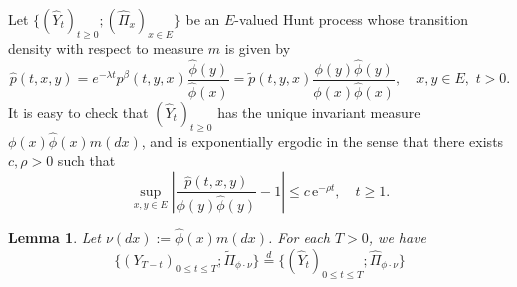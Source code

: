 \documentclass[12pt,a4paper]{amsart}
\numberwithin{equation}{section}
\theoremstyle{plain}
\newtheorem{lem}[thm]{Lemma}
\theoremstyle{definition}
\theoremstyle{remark}
\begin{document}
	Let $\{(\widehat{Y}_t)_{t\geq 0}; (\widehat{\Pi}_x)_{x\in E}\}$ be an $E$-valued Hunt process whose transition density with respect to measure $m$ is given by
\[
    \hat{p}(t,x,y)
    =e^{-\lambda t}p^\beta(t,y,x)\frac{{\hat\phi}(y)}{{\hat\phi}(x)}
    =\tilde p(t,y,x)\frac{\phi(y){\hat\phi}(y)}{\phi(x){\hat\phi}(x)},
    \quad x,y \in E,\,\, t> 0.
\]
	It is easy to check that $(\widehat Y_t)_{t\geq 0}$ has the unique invariant measure $\phi(x)\hat\phi(x)m(dx)$, and is exponentially ergodic in the sense that there exists $c, \rho > 0$ such that
\begin{equation}\label{IU'}
	\sup_{x,y\in E}\left|\frac{\hat{p}(t, x,y)}{\phi(y) \hat\phi(y)}- 1\right|\le c\,\mbox{e}^{-\rho t}, \quad t\geq 1.
\end{equation}
\begin{lem}
\label{lem:reverse of the spine}
	Let $\nu(dx):=\hat\phi(x)m(dx)$.
	For each $T > 0$, we have
\[
	\{(Y_{T-t})_{0\leq t\leq T}; \widetilde \Pi_{\phi \cdot \nu}\}
	\overset{d}{=} \{(\widehat Y_{t})_{0\leq t\leq T}; \widehat \Pi_{\phi \cdot \nu}\}
\]
\end{lem}
\end{document}
